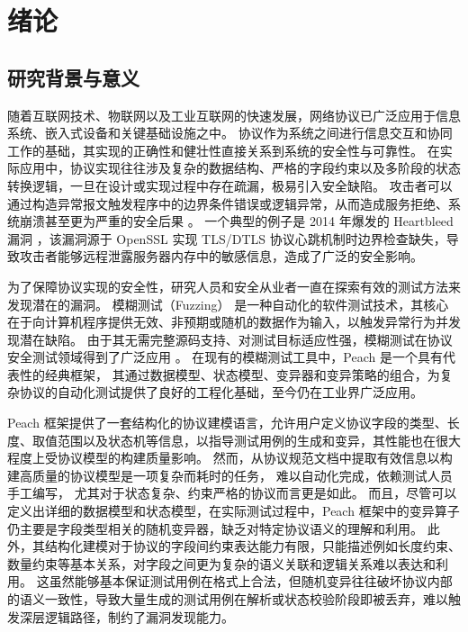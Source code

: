 \chapter{绪论}

\section{研究背景与意义}

随着互联网技术、物联网以及工业互联网的快速发展，网络协议已广泛应用于信息系统、嵌入式设备和关键基础设施之中。
协议作为系统之间进行信息交互和协同工作的基础，其实现的正确性和健壮性直接关系到系统的安全性与可靠性。
在实际应用中，协议实现往往涉及复杂的数据结构、严格的字段约束以及多阶段的状态转换逻辑，一旦在设计或实现过程中存在疏漏，极易引入安全缺陷。
攻击者可以通过构造异常报文触发程序中的边界条件错误或逻辑异常，从而造成服务拒绝、系统崩溃甚至更为严重的安全后果 \cite{de2015protocol, manes2019art}。
一个典型的例子是 2014 年爆发的 Heartbleed 漏洞 \cite{durumeric2014matter}，该漏洞源于 OpenSSL 实现 TLS/DTLS 协议心跳机制时边界检查缺失，导致攻击者能够远程泄露服务器内存中的敏感信息，造成了广泛的安全影响。


为了保障协议实现的安全性，研究人员和安全从业者一直在探索有效的测试方法来发现潜在的漏洞。
模糊测试（Fuzzing） \cite{manes2019art, ren2021survey} 是一种自动化的软件测试技术，其核心在于向计算机程序提供无效、非预期或随机的数据作为输入，以触发异常行为并发现潜在缺陷。
由于其无需完整源码支持、对测试目标适应性强，模糊测试在协议安全测试领域得到了广泛应用 \cite{zhang2024survey, li2011automated}。
在现有的模糊测试工具中，Peach\cite{gitlab_protocol_fuzzer_ce} 是一个具有代表性的经典框架，
其通过数据模型、状态模型、变异器和变异策略的组合，为复杂协议的自动化测试提供了良好的工程化基础，至今仍在工业界广泛应用。

Peach 框架提供了一套结构化的协议建模语言，允许用户定义协议字段的类型、长度、取值范围以及状态机等信息，以指导测试用例的生成和变异，其性能也在很大程度上受协议模型的构建质量影响\cite{zhang2023survey}。
然而，从协议规范文档中提取有效信息以构建高质量的协议模型是一项复杂而耗时的任务，
难以自动化完成，依赖测试人员手工编写，
尤其对于状态复杂、约束严格的协议而言更是如此。
而且，尽管可以定义出详细的数据模型和状态模型，在实际测试过程中，Peach 框架中的变异算子仍主要是字段类型相关的随机变异器，缺乏对特定协议语义的理解和利用。
此外，其结构化建模对于协议的字段间约束表达能力有限，只能描述例如长度约束、数量约束等基本关系，对字段之间更为复杂的语义关联和逻辑关系难以表达和利用。
这虽然能够基本保证测试用例在格式上合法，但随机变异往往破坏协议内部的语义一致性，导致大量生成的测试用例在解析或状态校验阶段即被丢弃，难以触发深层逻辑路径，制约了漏洞发现能力。

